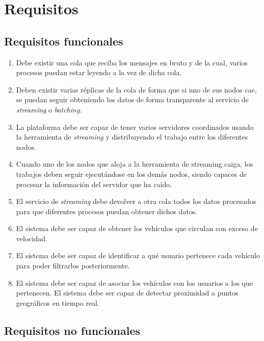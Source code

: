 
\chapter{Requisitos\label{requisitos}}

\section{Requisitos funcionales\label{RF}}

\begin{enumerate}
\item Debe existir una cola que reciba los mensajes en bruto y de la cual,
  varios procesos puedan estar leyendo a la vez de dicha cola.
\item Deben existir varias réplicas de la cola de forma que si uno de sus
  nodos cae, se puedan seguir obteniendo los datos de forma transparente al
  servicio de {\em streaming} o {\em batching}.
\item La plataforma debe ser capaz de tener varios servidores coordinados
  usando la herramienta de {\em streaming} y distribuyendo el trabajo entre
  los diferentes nodos.
\item Cuando uno de los nodos que aloja a la herramienta de streaming
  caiga, los trabajos deben seguir ejecutándose en los demás nodos, siendo
  capaces de procesar la información del servidor que ha caído.
\item El servicio de {\em streaming} debe devolver a otra cola todos los
  datos procesados para que diferentes procesos puedan obtener dichos
  datos.
\item El sistema debe ser capaz de obtener los vehículos que circulan con
  exceso de velocidad.
\item El sistema debe ser capaz de identificar a qué usuario pertenece cada
  vehículo para poder filtrarlos posteriormente.
\item El sistema debe ser capaz de asociar los vehículos con los usuarios a
  los que pertenecen. El sistema debe ser capaz de detectar proximidad a
  puntos geográficos en tiempo real.
\end{enumerate}

\section{Requisitos no funcionales\label{RNF}}

